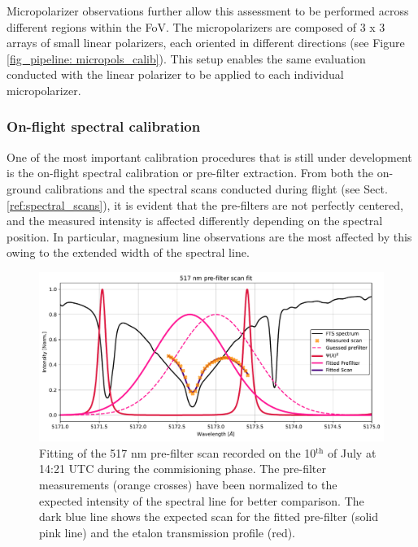 Micropolarizer observations further allow this assessment to be performed across different regions within the FoV. The micropolarizers are composed of 3 x 3 arrays of small linear polarizers, each oriented in different directions (see Figure \ref{fig_pipeline: micropols_calib}). This setup enables the same evaluation conducted with the linear polarizer to be applied to each individual micropolarizer.


\subsubsection{\label{sect:pipeline_prefilter_scans_fit}On-flight spectral calibration}

One of the most important calibration procedures that is still under development is the on-flight spectral calibration or pre-filter extraction. From both the on-ground calibrations and the spectral scans conducted during flight (see Sect. \ref{ref:spectral_scans}), it is evident that the pre-filters are not perfectly centered, and the measured intensity is affected differently depending on the spectral position. In particular, magnesium line observations are the most affected by this owing to the extended width of the spectral line.

\begin{figure}[t]
  \includegraphics[width=\textwidth]{figures/Pipeline/Prefilterfit.pdf}
  \caption[Prefilter fitting.]{
    Fitting of the 517 nm pre-filter scan recorded on the 10$^\text{th}$ of July at 14:21 UTC during the commisioning phase. The pre-filter measurements (orange crosses) have been normalized to the expected intensity of the spectral line for better comparison. The dark blue line shows the expected scan for the fitted pre-filter (solid pink line) and the etalon transmission profile (red).}
    \label{fig_pipeline: prefilter_fit}
\end{figure}


